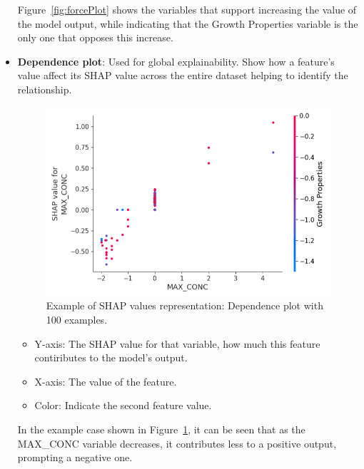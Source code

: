 \begin{itemize}
    Figure~\ref{fig:forcePlot} shows the variables that support increasing the value of the model output, while indicating that the Growth Properties variable is the only one that opposes this increase.

    \item \textbf{Dependence plot}: Used for global explainability. Show how a feature's value affect its SHAP value across the entire dataset helping to identify the relationship.
    \begin{figure}[H]
        \centering
        \includegraphics[width=1\textwidth]{figures/shap/depence_plot.png}
        \caption{Example of SHAP values representation: Dependence plot with 100 examples.}
        \label{fig:dependecePlot}
    \end{figure}

    \begin{itemize}
        \item Y-axis: The SHAP value for that variable, how much this feature contiributes to the model's output.
        \item X-axis: The value of the feature.
        \item Color: Indicate the second feature value.
    \end{itemize}

    In the example case shown in Figure~\ref{fig:dependecePlot}, it can be seen that as the MAX\_CONC variable decreases, it contributes less to a positive output, prompting a negative one.
\end{itemize}


